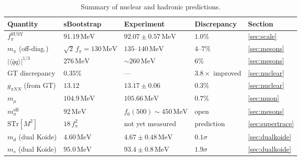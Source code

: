 \documentclass[12pt,a4paper]{article}
\newcommand{\MeV}{\,\text{MeV}}
\newcommand{\fpi}{f_\pi}
\newcommand{\qqbar}{\langle\bar{q}q\rangle}
\begin{document}
\begin{table}[ht]
\centering
\small
\begin{tabular}{lllll}
\toprule
Quantity & sBootstrap & Experiment & Discrepancy & Section \\
\midrule
$\fpi^{\text{SUSY}}$ & $91.19\MeV$ & $92.07 \pm 0.57\MeV$ & $1.0\%$
  & \ref{sec:scale} \\
$m_\pi$ (off-diag.) & $\sqrt{2}\,\fpi = 130\MeV$ & $135$--$140\MeV$ & $4$--$7\%$
  & \ref{sec:mesons} \\
$|\qqbar|^{1/3}$ & $276\MeV$ & $\sim 260\MeV$ & $6\%$
  & \ref{sec:mesons} \\
GT discrepancy & $0.35\%$ & --- & $3.8\times$ improved
  & \ref{sec:nuclear} \\
$g_{\pi NN}$ (from GT) & $13.12$ & $13.17 \pm 0.06$ & $0.3\%$
  & \ref{sec:nuclear} \\
$m_\mu$ & $104.9\MeV$ & $105.66\MeV$ & $0.7\%$
  & \ref{sec:muon} \\
$m_\sigma^{\text{sB}}$ & $92\MeV$ & $f_0(500) \sim 450\MeV$ & open
  & \ref{sec:mesons} \\
$\text{STr}[M^2]$ & $18\,\fpi^2$ & not yet measured & prediction
  & \ref{sec:supertrace} \\
$m_d$ (dual Koide) & $4.60\MeV$ & $4.67 \pm 0.48\MeV$ & $0.1\sigma$
  & \ref{sec:dualkoide} \\
$m_s$ (dual Koide) & $95.0\MeV$ & $93.4 \pm 0.8\MeV$ & $1.9\sigma$
  & \ref{sec:dualkoide} \\
\bottomrule
\end{tabular}
\caption{Summary of nuclear and hadronic predictions.}
\end{table}
\end{document}
